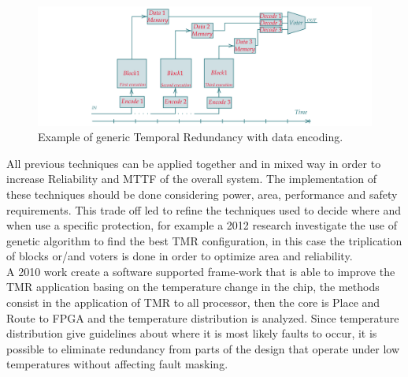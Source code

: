 {{{    		
			\begin{figure}[H]
    			\centering
    			\includegraphics[scale=0.2,center]{./images/TimeRedundancy2.png}
    			\caption{Example of generic Temporal Redundancy with data encoding.}
    			\label{fig:TemporalRedundancy2}
    		\end{figure} 
			
			
		}
	    
	    \vspace{1cm}
	    
	    All previous techniques can be applied together and in mixed way in order to increase Reliability and MTTF of the overall system. 
	    The implementation of these techniques should be done considering power, area, performance and safety requirements. 
	    This trade off led to refine the techniques used to decide where and when use a specific protection, for example a 2012 research   investigate the use of genetic algorithm to find the best TMR configuration, in this case the triplication of blocks or/and voters is done in order to optimize area and reliability. \\
	    
	    A 2010 work create a software supported frame-work that is able to improve the TMR application basing on the temperature change in the chip, the methods consist in the application of TMR to all processor, then the core is Place and Route to FPGA and the temperature distribution is analyzed. Since temperature distribution give guidelines about where it is most likely faults to occur, it is possible to eliminate redundancy from parts of the design that operate under low temperatures without affecting fault masking. \\
	    
}}
